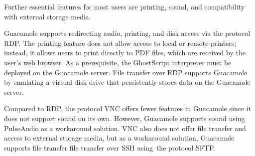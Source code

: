 \documentclass[runningheads]{llncs}
\begin{document}
Further essential features for most users are printing, sound, and compatibility with external storage media.



Guacamole supports redirecting audio, printing, and disk access via the protocol RDP. The printing feature does not allow access to local or remote printers; instead, it allows users to print directly to PDF files, which are received by the user's web browser. As a prerequisite, the GhostScript interpreter must be deployed on the Guacamole server.
File transfer over RDP supports Guacamole by emulating a virtual disk drive that persistently stores data on the Guacamole server.~\cite{ApacheGuacamole2024} 

Compared to RDP, the protocol VNC offers fewer features in Guacamole since it does not support sound on its own. However, Guacamole supports sound using PulseAudio as a workaround solution. VNC also does not offer file transfer and access to external storage media, but as a workaround solution, Guacamole supports file transfer file transfer over SSH using the protocol SFTP.
\end{document}
